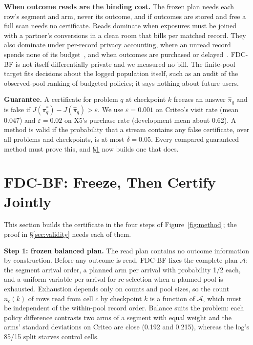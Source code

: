 \documentclass[sigconf,anonymous,review]{acmart}
\newcommand{\cA}{\mathcal{A}}
\newcommand{\eps}{\varepsilon}
\begin{document}
\textbf{When outcome reads are the binding cost.} The frozen plan needs each row's segment and arm, never its outcome, and if outcomes are stored and free a full scan needs no certificate. Reads dominate when exposures must be joined with a partner's conversions in a clean room that bills per matched record. They also dominate under per-record privacy accounting, where an unread record spends none of its budget~\citep{feldman2021individual}, and when outcomes are purchased or delayed~\citep{chapelle2014modeling}. FDC-BF is not itself differentially private and we measured no bill. The finite-pool target fits decisions about the logged population itself, such as an audit of the observed-pool ranking of budgeted policies; it says nothing about future users.

\textbf{Guarantee.} A certificate for problem $q$ at checkpoint $k$ freezes an answer $\hat\pi_q$ and is false if $J(\pi^*_q) - J(\hat\pi_q) > \eps$. We use $\eps = 0.001$ on Criteo's visit rate (mean 0.047) and $\eps = 0.02$ on X5's purchase rate (development mean about 0.62). A method is valid if the probability that a stream contains any false certificate, over all problems and checkpoints, is at most $\delta = 0.05$. Every compared guaranteed method must prove this, and \S\ref{sec:method} now builds one that does.

\section{FDC-BF: Freeze, Then Certify Jointly}\label{sec:method}

This section builds the certificate in the four steps of Figure~\ref{fig:method}; the proof in \S\ref{sec:validity} needs each of them.

\textbf{Step 1: frozen balanced plan.} The read plan contains no outcome information by construction. Before any outcome is read, FDC-BF fixes the complete plan $\cA$: the segment arrival order, a planned arm per arrival with probability 1/2 each, and a uniform variable per arrival for re-selection when a planned pool is exhausted. Exhaustion depends only on counts and pool sizes, so the count $n_c(k)$ of rows read from cell $c$ by checkpoint $k$ is a function of $\cA$, which must be independent of the within-pool record order. Balance suits the problem: each policy difference contrasts two arms of a segment with equal weight and the arms' standard deviations on Criteo are close (0.192 and 0.215), whereas the log's 85/15 split starves control cells.
\end{document}
